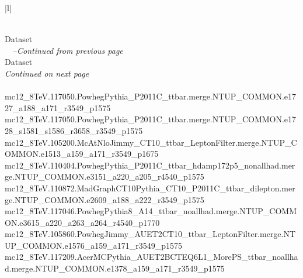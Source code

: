 \begin{longtable}{|l|}
\caption{Dataset names of Monte Carlo samples used in this analysis.} \\ \hline
\label{t:dsname}
Dataset \\\hline \hline
\endfirsthead
{} %
 {\tablename\ \thetable\ --\textit{Continued from previous page}} \\ \hline
 Dataset  \\ \hline \hline
\endhead
\hline {} {\textit{Continued on next page}} \\
\endfoot
\hline \hline
\endlastfoot
\textbf{\ttbar} \\
\hline
\tiny mc12\_8TeV.117050.PowhegPythia\_P2011C\_ttbar.merge.NTUP\_COMMON.e1727\_a188\_a171\_r3549\_p1575 \\
\hline
\tiny mc12\_8TeV.117050.PowhegPythia\_P2011C\_ttbar.merge.NTUP\_COMMON.e1728\_s1581\_s1586\_r3658\_r3549\_p1575 \\

\tiny mc12\_8TeV.105200.McAtNloJimmy\_CT10\_ttbar\_LeptonFilter.merge.NTUP\_COMMON.e1513\_a159\_a171\_r3549\_p1675 \\

\tiny mc12\_8TeV.110404.PowhegPythia\_P2011C\_ttbar\_hdamp172p5\_nonallhad.merge.NTUP\_COMMON.e3151\_a220\_a205\_r4540\_p1575 \\

\tiny mc12\_8TeV.110872.MadGraphCT10Pythia\_CT10\_P2011C\_ttbar\_dilepton.merge.NTUP\_COMMON.e2609\_a188\_a222\_r3549\_p1575 \\
\tiny mc12\_8TeV.117046.PowhegPythia8\_A14\_ttbar\_noallhad.merge.NTUP\_COMMON.e3615\_a220\_a263\_a264\_r4540\_p1770 \\

\tiny mc12\_8TeV.105860.PowhegJimmy\_AUET2CT10\_ttbar\_LeptonFilter.merge.NTUP\_COMMON.e1576\_a159\_a171\_r3549\_p1575 \\
\hline
\tiny mc12\_8TeV.117209.AcerMCPythia\_AUET2BCTEQ6L1\_MorePS\_ttbar\_noallhad.merge.NTUP\_COMMON.e1378\_a159\_a171\_r3549\_p1575 \\


\end{longtable}
